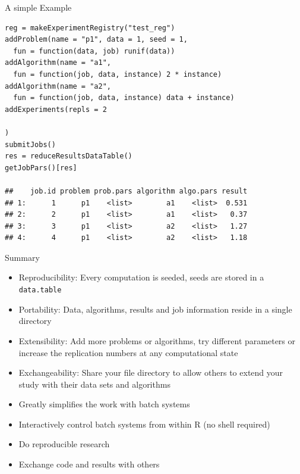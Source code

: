 \documentclass[11pt,compress,t,notes=noshow, aspectratio=169, xcolor=table]{beamer}
\begin{document}
\begin{frame}[fragile]{A simple Example}
  
\begin{lstlisting}
reg = makeExperimentRegistry("test_reg")
addProblem(name = "p1", data = 1, seed = 1,
  fun = function(data, job) runif(data))
addAlgorithm(name = "a1",
  fun = function(job, data, instance) 2 * instance)
addAlgorithm(name = "a2",
  fun = function(job, data, instance) data + instance)
addExperiments(repls = 2

)
submitJobs()
res = reduceResultsDataTable()
getJobPars()[res]

##    job.id problem prob.pars algorithm algo.pars result
## 1:      1      p1    <list>        a1    <list>  0.531
## 2:      2      p1    <list>        a1    <list>   0.37
## 3:      3      p1    <list>        a2    <list>   1.27
## 4:      4      p1    <list>        a2    <list>   1.18
\end{lstlisting}
  
\end{frame}

\begin{frame}[fragile]{Summary}
  \begin{itemize}
    \item Reproducibility: Every computation is seeded, seeds are stored in a \texttt{data.table}
    \item Portability: Data, algorithms, results and job information reside in a single directory
    \item Extensibility: Add more problems or algorithms, try different parameters or increase the replication numbers at any computational state
    \item Exchangeability: Share your file directory to allow others to extend your study with their data sets and algorithms
  \end{itemize}
  \begin{itemize}
    \item Greatly simplifies the work with batch systems
    \item Interactively control batch systems from within R (no shell required)
    \item Do reproducible research
    \item Exchange code and results with others
  \end{itemize}
\end{frame}

\endlecture
\end{document}
